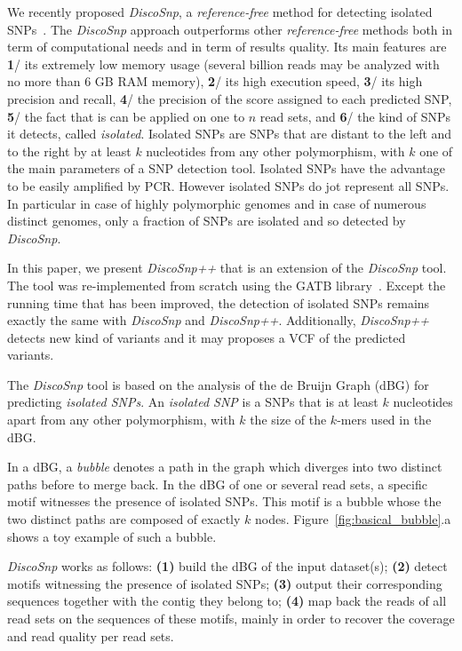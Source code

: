 \documentclass{bmcart}
\newcommand{\disco}{{\it DiscoSnp}\xspace}
\newcommand{\discopp}{{\it DiscoSnp++}\xspace}
\begin{document}
We recently proposed \disco, a \emph{reference-free} method for detecting isolated SNPs~\cite{Uricaru2014a}. The \disco approach outperforms other \emph{reference-free} methods both in term of computational needs and in term of results quality. Its main features are \textbf{1}/ its extremely low memory usage (several billion reads may be analyzed with no more than 6 GB RAM memory), \textbf{2}/ its high execution speed, \textbf{3}/ its high precision and recall, \textbf{4}/ the precision of the score assigned to each predicted SNP, \textbf{5}/ the fact that is can be applied on one to $n$ read sets, and \textbf{6}/ the kind of SNPs it detects, called \emph{isolated}. Isolated SNPs are SNPs that are distant to the left and to the right by at least $k$ nucleotides from any other polymorphism, with $k$ one of the main parameters of a SNP detection tool. Isolated SNPs have the advantage to be easily amplified by PCR. However isolated SNPs do jot represent all SNPs. In particular in case of highly polymorphic genomes and in case of numerous distinct genomes, only a fraction of SNPs are isolated and so detected by \disco.


In this paper, we present \discopp that is an extension of the \disco tool. The tool was re-implemented from scratch using the GATB library~\cite{Drezen2014}. Except the running time that has been improved, the detection of isolated SNPs remains exactly the same with \disco and \discopp. Additionally, \discopp detects new kind of variants and it may proposes a VCF of the predicted variants.  


The \disco tool is based on the analysis of the de Bruijn Graph (dBG) for predicting \emph{isolated SNPs}. An \emph{isolated SNP} is a SNPs that is at least $k$ nucleotides apart from any other polymorphism, with $k$ the size of the $k$-mers used in the dBG. 

In a dBG, a \emph{bubble} denotes a path in the graph which diverges into two distinct paths before to merge back. In the dBG of one or several read sets, a specific motif witnesses the presence of isolated SNPs. This motif is a bubble whose the two distinct paths are composed of exactly $k$ nodes. Figure~\ref{fig:basical_bubble}.a shows a toy example of such a bubble. 



\disco works as follows: \textbf{(1)} build the dBG of the input dataset(s);  \textbf{(2)} detect motifs witnessing the presence of isolated SNPs; \textbf{(3)} output their corresponding sequences together with the contig they belong to; \textbf{(4)} map back the reads of all read sets on the sequences of these motifs, mainly in order to recover the coverage and read quality per read sets. 
\end{document}
